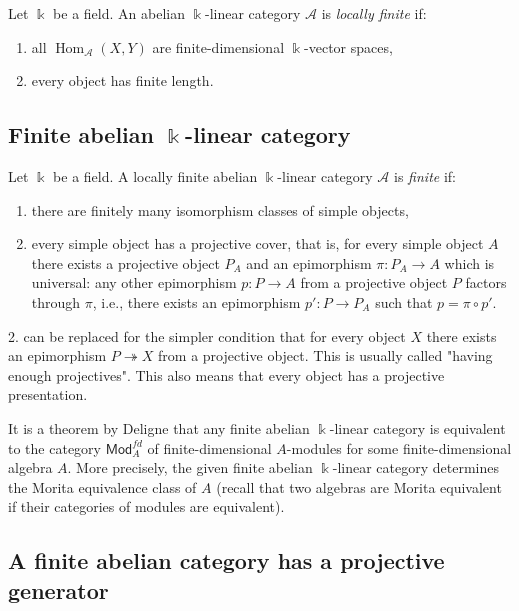 \documentclass[11pt]{article}
\theoremstyle{definition}
\begin{document}
Let \(\Bbbk\) be a field. An abelian \(\Bbbk\)-linear category \(\mathcal{A}\) is \emph{locally finite} if:
\begin{enumerate}
    \item all \(\operatorname{Hom}_{\mathcal{A}}(X, Y)\) are finite-dimensional \(\Bbbk\)-vector spaces,
    \item every object has finite length.
\end{enumerate}

\subsection{Finite abelian \(\Bbbk\)-linear category}

Let \(\Bbbk\) be a field. A locally finite abelian \(\Bbbk\)-linear category \(\mathcal{A}\) is \emph{finite} if:
\begin{enumerate}
    \item there are finitely many isomorphism classes of simple objects,
    \item every simple object has a projective cover, that is, for every simple object \(A\) there exists a projective object \(P_A\) and an epimorphism \(\pi: P_A \to A\) which is universal: any other epimorphism \(p: P \to A\) from a projective object \(P\) factors through \(\pi\), i.e., there exists an epimorphism \(p': P \to P_A\) such that \(p = \pi \circ p'\).
\end{enumerate}

2. can be replaced for the simpler condition that for every object $X$ there exists an epimorphism $P \twoheadrightarrow X$ from a projective object. This is usually  called "having enough projectives". This also means that every object has a projective presentation.\medskip

It is a theorem by Deligne that any finite abelian \(\Bbbk\)-linear category is equivalent to the category \(\mathsf{Mod}_A^{fd}\) of finite-dimensional \(A\)-modules for some finite-dimensional algebra \(A\). More precisely, the given finite abelian \(\Bbbk\)-linear category determines the Morita equivalence class of \(A\) (recall that two algebras are Morita equivalent if their categories of modules are equivalent).


\subsection{A finite abelian category has a projective generator}
\end{document}

